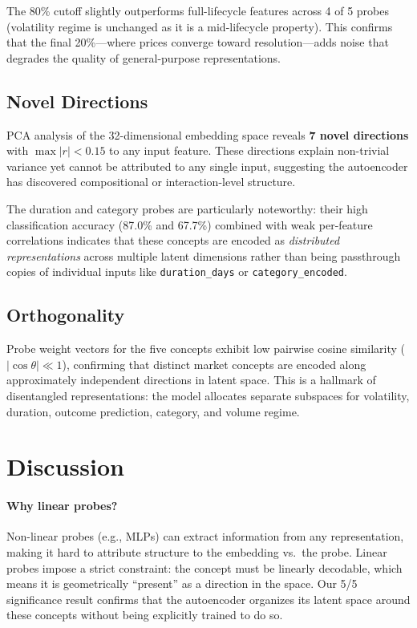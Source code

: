 \documentclass[11pt,a4paper]{article}
\begin{document}
The 80\% cutoff slightly outperforms full-lifecycle features across 4 of 5 probes (volatility regime is unchanged as it is a mid-lifecycle property). This confirms that the final 20\%---where prices converge toward resolution---adds noise that degrades the quality of general-purpose representations.

\subsection{Novel Directions}
\label{sec:novel}

PCA analysis of the 32-dimensional embedding space reveals \textbf{7 novel directions} with $\max|r| < 0.15$ to any input feature. These directions explain non-trivial variance yet cannot be attributed to any single input, suggesting the autoencoder has discovered compositional or interaction-level structure.

The duration and category probes are particularly noteworthy: their high classification accuracy (87.0\% and 67.7\%) combined with weak per-feature correlations indicates that these concepts are encoded as \emph{distributed representations} across multiple latent dimensions rather than being passthrough copies of individual inputs like \texttt{duration\_days} or \texttt{category\_encoded}.

\subsection{Orthogonality}

Probe weight vectors for the five concepts exhibit low pairwise cosine similarity ($|\cos \theta| \ll 1$), confirming that distinct market concepts are encoded along approximately independent directions in latent space. This is a hallmark of disentangled representations: the model allocates separate subspaces for volatility, duration, outcome prediction, category, and volume regime.

\section{Discussion}

\paragraph{Why linear probes?} Non-linear probes (e.g., MLPs) can extract information from any representation, making it hard to attribute structure to the embedding vs.\ the probe. Linear probes impose a strict constraint: the concept must be linearly decodable, which means it is geometrically ``present'' as a direction in the space. Our 5/5 significance result confirms that the autoencoder organizes its latent space around these concepts without being explicitly trained to do so.
\end{document}
